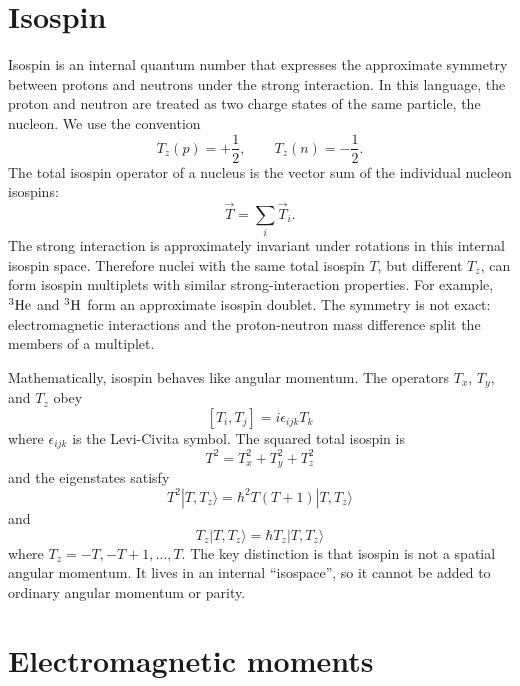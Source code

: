 \section*{Isospin}
Isospin is an internal quantum number that expresses the approximate symmetry between protons and neutrons under the strong interaction.  In this language, the proton and neutron are treated as two charge states of the same particle, the nucleon.  We use the convention
\[
  T_z(p)=+\frac{1}{2},\qquad T_z(n)=-\frac{1}{2}.
\]
The total isospin operator of a nucleus is the vector sum of the individual nucleon isospins:
\begin{equation}\label{eq:isospin_total}
  \vec{T}=\sum_i \vec{T}_i.
\end{equation}
The strong interaction is approximately invariant under rotations in this internal isospin space.  Therefore nuclei with the same total isospin \(T\), but different \(T_z\), can form isospin multiplets with similar strong-interaction properties.  For example, \(\nucleus{He}{3}\) and \(\nucleus{H}{3}\) form an approximate isospin doublet.  The symmetry is not exact: electromagnetic interactions and the proton-neutron mass difference split the members of a multiplet.

Mathematically, isospin behaves like angular momentum.  The operators \(T_x\), \(T_y\), and \(T_z\) obey
\begin{equation}\label{eq:isospin_commutation}[T_i, T_j] = i \epsilon_{ijk} T_k
\end{equation}
where \(\epsilon_{ijk}\) is the Levi-Civita symbol. The squared total isospin is
\begin{equation}\label{eq:isospin_total_squared}T^2 = T_x^2 + T_y^2 + T_z^2
\end{equation}
and the eigenstates satisfy
\begin{equation}\label{eq:isospin_eigenvalues}T^2 |T, T_z\rangle = \hbar^2 T(T+1) |T, T_z\rangle
\end{equation}
and
\begin{equation}\label{eq:isospin_projection}T_z |T, T_z\rangle = \hbar T_z |T, T_z\rangle
\end{equation}
where \(T_z=-T,-T+1,\ldots,T\).  The key distinction is that isospin is not a spatial angular momentum.  It lives in an internal ``isospace'', so it cannot be added to ordinary angular momentum or parity.

\section*{Electromagnetic moments}


